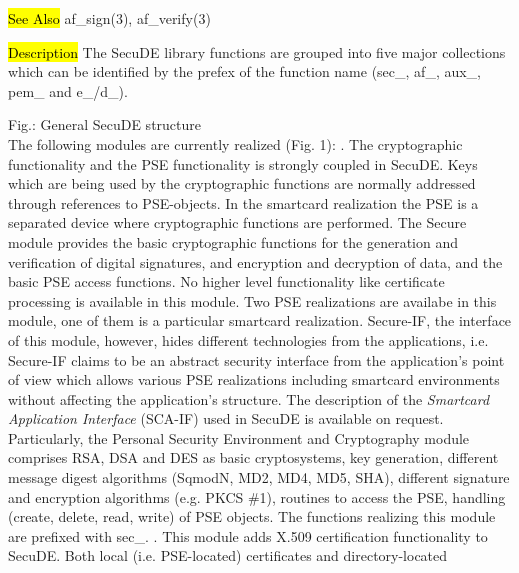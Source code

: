 \hl{See Also}
af\_sign(3), af\_verify(3)

\label{intro3}
\hl{Description}
The SecuDE library functions are grouped into five major collections which 
can be identified by the prefex of the function name (sec\_, af\_,
aux\_, pem\_ and e\_/d\_).


{\footnotesize Fig.:
General SecuDE structure}
\\ [1em]
The following modules are currently realized (Fig. 1):
\bi
{}. 
   The cryptographic functionality and the PSE functionality
   is strongly coupled in SecuDE. Keys which are being
   used by the cryptographic functions are normally addressed
   through references to PSE-objects. In the smartcard realization
   the PSE is a separated device where cryptographic functions
   are performed. The Secure module provides
   the basic cryptographic functions for the generation and 
   verification of digital signatures, and encryption and decryption 
   of data, and the basic PSE access functions. No higher level
   functionality like certificate processing is available in this module.
   Two PSE realizations are availabe in this module, one of them
   is a particular smartcard realization. Secure-IF, the interface of 
   this module, however, hides different technologies from
   the applications, i.e. Secure-IF claims to be an abstract security
   interface from the application's point of view which allows various
   PSE realizations including smartcard environments without affecting 
   the application's structure.
   The description of the {\em Smartcard Application Interface} (SCA-IF) 
   used in SecuDE is available on request.
   Particularly, the Personal Security Environment and Cryptography 
   module comprises
   \bi
   \m RSA, DSA and DES as basic cryptosystems,
   \m key generation,
   \m different message digest algorithms (SqmodN, MD2, MD4, MD5,
      SHA), 
   \m different signature and encryption algorithms (e.g. PKCS \#1),
   \m routines to access the PSE, handling (create, delete, read, write)
      of PSE objects.
   \ei
   The functions realizing this module are prefixed with sec\_.
. This module
   adds X.509 certification functionality to SecuDE.
   Both local (i.e. PSE-located) certificates and directory-located

